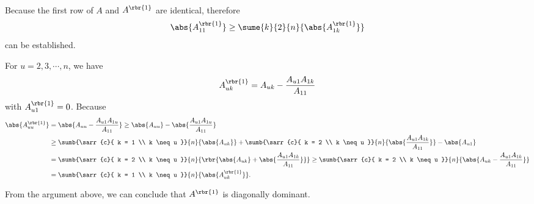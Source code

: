 \documentclass[english, nochinese]{../textmpls/pkupaper}
\title{\titlemark}
\author{\authoring}
\begin{document}
\maketitle

\begin{thmquestion}
\ 
\begin{thmproof}
Because the first row of $A$ and $A^{\rbr{1}}$ are identical, therefore
\begin{equation}
\abs{A^{\rbr{1}}_{11}} \ge \sume{k}{2}{n}{\abs{A^{\rbr{1}}_{1k}}}
\end{equation}
can be established.

For $ u = 2, 3, \cdots, n $, we have
\begin{equation}
A^{\rbr{1}}_{ u k } = A_{ u k } - \frac{ A_{ u 1 } A_{ 1 k } }{A_{ 1 1 }}
\end{equation}
with $ A^{\rbr{1}}_{ u 1 } = 0 $. Because
\begin{equation}
\begin{split}
\abs{A^{\rbr{1}}_{ u u }} &= \abs{ A_{ u u } - \frac{ A_{ u 1 } A_{ 1 u } }{A_{ 1 1 }} } \ge \abs{ A_{ u u } } - \abs{\frac{ A_{ u 1 } A_{ 1 u } }{A_{ 1 1 }}} \\
&\ge \sumb{\sarr{c}{ k = 1 \\ k \neq u }}{n}{\abs{A_{ u k }}} + \sumb{\sarr{c}{ k = 2 \\ k \neq u }}{n}{\abs{\frac{ A_{ u 1 } A_{ 1 k } }{A_{ 1 1 }}}} - \abs{A_{ u 1 }} \\
&= \sumb{\sarr{c}{ k = 2 \\ k \neq u }}{n}{\rbr{ \abs{A_{ u k }} + \abs{\frac{ A_{ u 1 } A_{ 1 k } }{A_{ 1 1 }}} }} \ge \sumb{\sarr{c}{ k = 2 \\ k \neq u }}{n}{ \abs{ A_{ u k } - \frac{ A_{ u 1 } A_{ 1 k } }{A_{ 1 1 }} } } \\
&= \sumb{\sarr{c}{ k = 1 \\ k \neq u }}{n}{\abs{A^{\rbr{1}}_{ u k }}}.
\end{split}
\end{equation}

From the argument above, we can conclude that $A^{\rbr{1}}$ is diagonally dominant.

\sqed
\end{thmproof}
\end{thmquestion}
\end{document}
